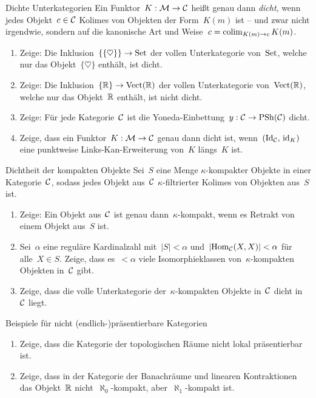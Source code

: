 \documentclass{uebblatt}
\begin{document}

\begin{aufgabe}{Dichte Unterkategorien}
Ein Funktor~$K : \mathcal{M} \to \mathcal{C}$ heißt genau dann \emph{dicht}, wenn jedes Objekt~$c
\in \mathcal{C}$ Kolimes von Objekten der Form~$K(m)$ ist -- und zwar nicht irgendwie,
sondern auf die kanonische Art und Weise~$c = \operatorname*{colim}_{K(m) \to c} K(m)$.
\begin{enumerate}
\item Zeige: Die Inklusion~$\{\{\heartsuit\}\} \to \mathrm{Set}$ der vollen
Unterkategorie von~$\mathrm{Set}$, welche nur das Objekt~$\{\heartsuit\}$ enthält, ist
dicht.
\item Zeige: Die Inklusion~$\{\mathbb{R}\} \to \mathrm{Vect}(\mathbb{R})$ der vollen
Unterkategorie von~$\mathrm{Vect}(\mathbb{R})$, welche nur das Objekt~$\mathbb{R}$ enthält, ist
nicht dicht.
\item Zeige: Für jede Kategorie~$\mathcal{C}$ ist die Yoneda-Einbettung~$y : \mathcal{C} \to
\mathrm{PSh}(\mathcal{C})$ dicht.
\item Zeige, dass ein Funktor~$K : \mathcal{M} \to \mathcal{C}$ genau dann dicht ist,
wenn~$(\mathrm{Id}_{\mathcal{C}},\,\mathrm{id}_K)$ eine punktweise Links-Kan-Erweiterung von~$K$
längs~$K$ ist.
\end{enumerate}
\end{aufgabe}

\begin{aufgabe}{Dichtheit der kompakten Objekte}
Sei~$S$ eine Menge $\kappa$-kompakter Objekte in einer Kategorie~$\mathcal{C}$,
sodass jedes Objekt aus~$\mathcal{C}$ $\kappa$-filtrierter Kolimes von Objekten aus~$S$
ist.
\begin{enumerate}
\item Zeige: Ein Objekt aus~$\mathcal{C}$ ist genau dann~$\kappa$-kompakt, wenn es
Retrakt von einem Objekt aus~$S$ ist.
\item Sei~$\alpha$ eine reguläre Kardinalzahl mit~$|S| < \alpha$
und~$|\mathrm{Hom}_{\mathcal{C}}(X,X)| < \alpha$ für alle~$X \in S$. Zeige, dass es~$< \alpha$
viele Isomorphieklassen von~$\kappa$-kompakten Objekten in~$\mathcal{C}$
gibt.
\item Zeige, dass die volle Unterkategorie der~$\kappa$-kompakten Objekte in~$\mathcal{C}$ dicht
in~$\mathcal{C}$ liegt.
\end{enumerate}
\end{aufgabe}

\begin{aufgabe}{Beispiele für nicht (endlich-)präsentierbare Kategorien}
\begin{enumerate}
\item Zeige, dass die Kategorie der topologischen Räume nicht lokal präsentierbar
ist.
\item Zeige, dass in der Kategorie der Banachräume und linearen Kontraktionen
das Objekt~$\mathbb{R}$ nicht~$\aleph_0$-kompakt, aber~$\aleph_1$-kompakt ist.
\end{enumerate}
\end{aufgabe}
\end{document}
